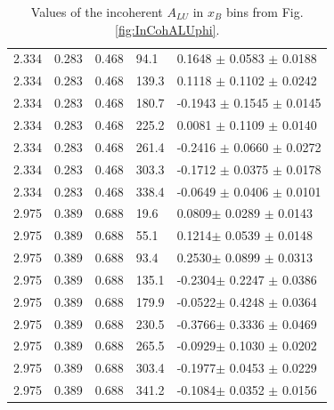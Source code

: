 \documentclass{article}
\begin{document}
\begin{table}[!h]
\begin{center}
\begin{tabular}{||l|l|l|l|l||}
  2.334 & 0.283 & 0.468 &  94.1  &  0.1648 $\pm$ 0.0583  $\pm$  0.0188 \\
  2.334 & 0.283 & 0.468 & 139.3  &  0.1118 $\pm$ 0.1102  $\pm$  0.0242 \\
  2.334 & 0.283 & 0.468 & 180.7  & -0.1943 $\pm$ 0.1545  $\pm$  0.0145 \\
  2.334 & 0.283 & 0.468 & 225.2  &  0.0081 $\pm$ 0.1109  $\pm$  0.0140 \\
  2.334 & 0.283 & 0.468 & 261.4  & -0.2416 $\pm$ 0.0660  $\pm$  0.0272 \\
  2.334 & 0.283 & 0.468 & 303.3  & -0.1712 $\pm$ 0.0375  $\pm$  0.0178 \\
  2.334 & 0.283 & 0.468 & 338.4  & -0.0649 $\pm$ 0.0406  $\pm$  0.0101 \\
  \hline
  2.975 & 0.389 & 0.688 &   19.6 &   0.0809$\pm$  0.0289 $\pm$  0.0143 \\
  2.975 & 0.389 & 0.688 &   55.1 &   0.1214$\pm$  0.0539 $\pm$  0.0148 \\
  2.975 & 0.389 & 0.688 &   93.4 &   0.2530$\pm$  0.0899 $\pm$  0.0313 \\
  2.975 & 0.389 & 0.688 &  135.1 &  -0.2304$\pm$  0.2247 $\pm$  0.0386 \\
  2.975 & 0.389 & 0.688 &  179.9 &  -0.0522$\pm$  0.4248 $\pm$  0.0364 \\
  2.975 & 0.389 & 0.688 &  230.5 &  -0.3766$\pm$  0.3336 $\pm$  0.0469 \\
  2.975 & 0.389 & 0.688 &  265.5 &  -0.0929$\pm$  0.1030 $\pm$  0.0202 \\
  2.975 & 0.389 & 0.688 &  303.4 &  -0.1977$\pm$  0.0453 $\pm$  0.0229 \\
  2.975 & 0.389 & 0.688 &  341.2 &  -0.1084$\pm$  0.0352 $\pm$  0.0156 \\
 \hline
 \hline
 \end{tabular}
 \caption{Values of the incoherent $A_{LU}$ in $x_B$ bins from Fig. \ref{fig:InCohALUphi}.}
 \label{table:InCoh_xB_BSA}
 \end{center}
\end{table}
\end{document}
